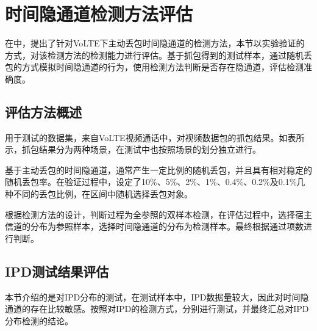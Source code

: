 \section{时间隐通道检测方法评估}
\label{chap:analyze:result}

在中，提出了针对VoLTE下主动丢包时间隐通道的检测方法，本节以实验验证的方式，对该检测方法的检测能力进行评估。基于抓包得到的测试样本，通过随机丢包的方式模拟时间隐通道的行为，使用检测方法判断是否存在隐通道，评估检测准确度。

\subsection{评估方法概述}
\label{chap:analyze:result:abstract}

用于测试的数据集，来自VoLTE视频通话中，对视频数据包的抓包结果。如表所示，抓包结果分为两种场景，在测试中也按照场景的划分独立进行。

基于主动丢包的时间隐通道，通常产生一定比例的随机丢包，并且具有相对稳定的随机丢包率。在验证过程中，设定了10\%、5\%、2\%、1\%、0.4\%、0.2\%及0.1\%几种不同的丢包比例，在区间中随机选择丢包对象。

根据检测方法的设计，判断过程为全参照的双样本检测，在评估过程中，选择宿主信道的分布为参照样本，选择时间隐通道的分布为检测样本。最终根据通过项数进行判断。

\subsection{IPD测试结果评估}
\label{chap:analyze:result:ipd}

本节介绍的是对IPD分布的测试，在测试样本中，IPD数据量较大，因此对时间隐通道的存在比较敏感。按照对IPD的检测方式，分别进行测试，并最终汇总对IPD分布检测的结论。

